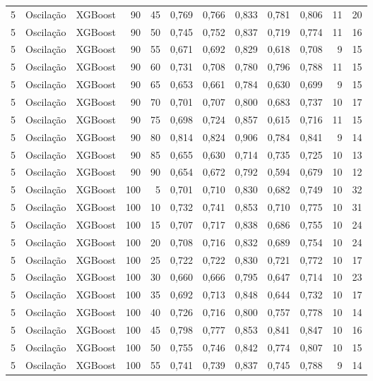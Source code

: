 \begin{longtable}{@{}rllrrrrrrrrr@{}}
5 & Oscilação & XGBoost & 90 & 45 & 0,769 & 0,766 & 0,833 & 0,781 & 0,806 & 11 & 20 \\
5 & Oscilação & XGBoost & 90 & 50 & 0,745 & 0,752 & 0,837 & 0,719 & 0,774 & 11 & 16 \\
5 & Oscilação & XGBoost & 90 & 55 & 0,671 & 0,692 & 0,829 & 0,618 & 0,708 & 9 & 15 \\
5 & Oscilação & XGBoost & 90 & 60 & 0,731 & 0,708 & 0,780 & 0,796 & 0,788 & 11 & 15 \\
5 & Oscilação & XGBoost & 90 & 65 & 0,653 & 0,661 & 0,784 & 0,630 & 0,699 & 9 & 15 \\
5 & Oscilação & XGBoost & 90 & 70 & 0,701 & 0,707 & 0,800 & 0,683 & 0,737 & 10 & 17 \\
5 & Oscilação & XGBoost & 90 & 75 & 0,698 & 0,724 & 0,857 & 0,615 & 0,716 & 11 & 15 \\
5 & Oscilação & XGBoost & 90 & 80 & 0,814 & 0,824 & 0,906 & 0,784 & 0,841 & 9 & 14 \\
5 & Oscilação & XGBoost & 90 & 85 & 0,655 & 0,630 & 0,714 & 0,735 & 0,725 & 10 & 13 \\
5 & Oscilação & XGBoost & 90 & 90 & 0,654 & 0,672 & 0,792 & 0,594 & 0,679 & 10 & 12 \\
5 & Oscilação & XGBoost & 100 & 5 & 0,701 & 0,710 & 0,830 & 0,682 & 0,749 & 10 & 32 \\
5 & Oscilação & XGBoost & 100 & 10 & 0,732 & 0,741 & 0,853 & 0,710 & 0,775 & 10 & 31 \\
5 & Oscilação & XGBoost & 100 & 15 & 0,707 & 0,717 & 0,838 & 0,686 & 0,755 & 10 & 24 \\
5 & Oscilação & XGBoost & 100 & 20 & 0,708 & 0,716 & 0,832 & 0,689 & 0,754 & 10 & 24 \\
5 & Oscilação & XGBoost & 100 & 25 & 0,722 & 0,722 & 0,830 & 0,721 & 0,772 & 10 & 17 \\
5 & Oscilação & XGBoost & 100 & 30 & 0,660 & 0,666 & 0,795 & 0,647 & 0,714 & 10 & 23 \\
5 & Oscilação & XGBoost & 100 & 35 & 0,692 & 0,713 & 0,848 & 0,644 & 0,732 & 10 & 17 \\
5 & Oscilação & XGBoost & 100 & 40 & 0,726 & 0,716 & 0,800 & 0,757 & 0,778 & 10 & 14 \\
5 & Oscilação & XGBoost & 100 & 45 & 0,798 & 0,777 & 0,853 & 0,841 & 0,847 & 10 & 16 \\
5 & Oscilação & XGBoost & 100 & 50 & 0,755 & 0,746 & 0,842 & 0,774 & 0,807 & 10 & 15 \\
5 & Oscilação & XGBoost & 100 & 55 & 0,741 & 0,739 & 0,837 & 0,745 & 0,788 & 9 & 14 \\

\end{longtable}
